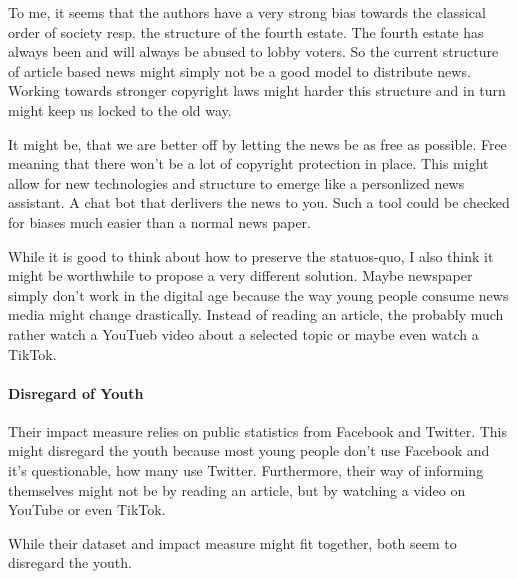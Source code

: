 \documentclass[12pt]{article}
\begin{document}
To me, it seems that the authors have a very
strong bias towards the classical order of society resp. the structure of
the fourth estate. The fourth estate has always been and will always be abused
to lobby voters. So the current structure of article based news might simply
not be a good model to distribute news. Working towards stronger copyright
laws might harder this structure and in turn might keep us locked to the old
way.

It might be, that we are better off by letting the news be as free as possible.
Free meaning that there won't be a lot of copyright protection in place. This
might allow for new technologies and structure to emerge like a personlized
news assistant. A chat bot that derlivers the news to you. Such a tool could
be checked for biases much easier than a normal news paper.

While it is good to think about how to preserve the statuos-quo, I also think
it might be worthwhile to propose a very different solution. Maybe newspaper
simply don't work in the digital age because the way young people consume
news media might change drastically. Instead of reading an article, the
probably much rather watch a YouTueb video about a selected topic or maybe
even watch a TikTok.

\paragraph{Disregard of Youth} Their impact measure relies on public
statistics from Facebook and Twitter. This might disregard the youth because
most young people don't use Facebook and it's questionable, how many use
Twitter. Furthermore, their way of informing themselves might not be by reading
an article, but by watching a video on YouTube or even TikTok.

While their dataset and impact measure might fit together, both seem to
disregard the youth.
\end{document}
